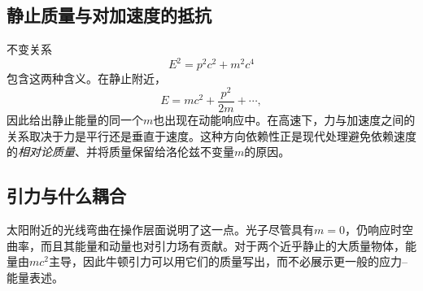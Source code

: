 \subsection{静止质量与对加速度的抵抗}

\begin{classroomqa}
\end{classroomqa}

不变关系
\begin{equation}
  E^2=p^2c^2+m^2c^4
  \label{eq:l09-energy-momentum}
\end{equation}
包含这两种含义。在静止附近，
\begin{equation}
  E=mc^2+\frac{p^2}{2m}+\cdots,
\end{equation}
因此给出静止能量的同一个\(m\)也出现在动能响应中。在高速下，力与加速度之间的关系取决于力是平行还是垂直于速度。这种方向依赖性正是现代处理避免依赖速度的\emph{相对论质量}、并将质量保留给洛伦兹不变量\(m\)的原因。

\subsection{引力与什么耦合}

\begin{classroomqa}
\end{classroomqa}

太阳附近的光线弯曲在操作层面说明了这一点。光子尽管具有\(m=0\)，仍响应时空曲率，而且其能量和动量也对引力场有贡献。对于两个近乎静止的大质量物体，能量由\(mc^2\)主导，因此牛顿引力可以用它们的质量写出，而不必展示更一般的应力--能量表述。

\begin{classroomqa}
\end{classroomqa}

